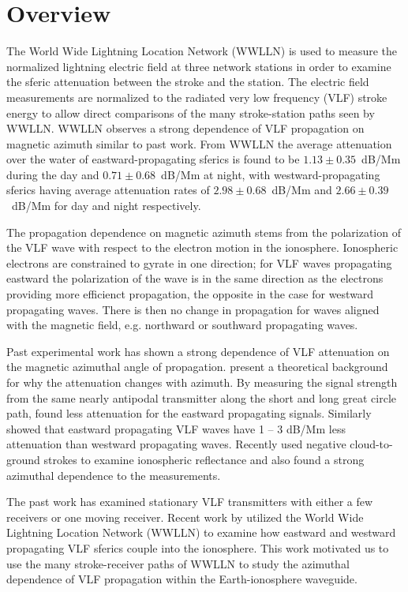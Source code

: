 \section{Overview}

The World Wide Lightning Location Network (WWLLN) is used to measure the normalized lightning electric field at three network stations in order to examine the sferic attenuation between the stroke and the station.
The electric field measurements are normalized to the radiated very low frequency (VLF) stroke energy to allow direct comparisons of the many stroke-station paths seen by WWLLN.
WWLLN observes a strong dependence of VLF propagation on magnetic azimuth similar to past work.
From WWLLN the average attenuation over the water of eastward-propagating sferics is found to be $1.13\pm0.35$~dB/Mm during the day and $0.71\pm0.68$~dB/Mm at night, with westward-propagating sferics having average attenuation rates of $2.98\pm0.68$~dB/Mm and $2.66\pm0.39$~dB/Mm for day and night respectively.

The propagation dependence on magnetic azimuth stems from the polarization of the VLF wave with respect to the electron motion in the ionosphere.
Ionospheric electrons are constrained to gyrate in one direction; for VLF waves propagating eastward the polarization of the wave is in the same direction as the electrons providing more efficienct propagation, the opposite in the case for westward propagating waves.
There is then no change in propagation for waves aligned with the magnetic field, e.g. northward or southward propagating waves.

Past experimental work has shown a strong dependence of VLF attenuation on the magnetic azimuthal angle of propagation.
\citet{Wait1960a} present a theoretical background for why the attenuation changes with azimuth.
By measuring the signal strength from the same nearly antipodal transmitter along the short and long great circle path, \citet{Crombie1958} found less attenuation for the eastward propagating signals.
Similarly \citet{Taylor1960a} showed that eastward propagating VLF waves have 1 -- 3 dB/Mm less attenuation than westward propagating waves.
Recently \citet{Jacobson2012} used negative cloud-to-ground strokes to examine ionospheric reflectance and also found a strong azimuthal dependence to the measurements.

The past work has examined stationary VLF transmitters with either a few receivers or one moving receiver.
Recent work by \citet{Burkholder2013} utilized the World Wide Lightning Location Network (WWLLN) to examine how eastward and westward propagating VLF sferics couple into the ionosphere.
This work motivated us to use the many stroke-receiver paths of WWLLN to study the azimuthal dependence of VLF propagation within the Earth-ionosphere waveguide.

